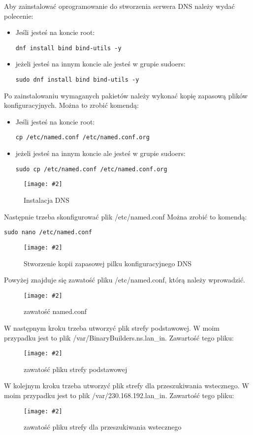 \documentclass[a4paper]{article}
\newcommand*{\zdj}[2][\textwidth]{\texttt{[image: \#2]}}
\newcommand*{\fg}[4][!htb]{
      \begin{figure*}[#1]
            \zdj{#2}
            \caption[#4]{#3}
      \end{figure*}
}
\begin{document}
\newpage
Aby zainstalować oprogramowanie do stworzenia serwera DNS należy wydać polecenie:

\begin{itemize}
      \item Jeśli jesteś na koncie root:
\begin{Verbatim}[frame=single]
dnf install bind bind-utils -y
\end{Verbatim}

      \item jeżeli jesteś na innym koncie ale jesteś w grupie sudoers:  
\begin{Verbatim}[frame=single]
sudo dnf install bind bind-utils -y
\end{Verbatim}
\end{itemize}
Po zainstalowaniu wymaganych pakietów należy wykonać kopię zapasową plików konfiguracyjnych. Można to zrobić komendą: 

\begin{itemize}
      \item Jeśli jesteś na koncie root:
\begin{Verbatim}[frame=single]
cp /etc/named.conf /etc/named.conf.org
\end{Verbatim}

      \item jeżeli jesteś na innym koncie ale jesteś w grupie sudoers:  
\begin{Verbatim}[frame=single]
sudo cp /etc/named.conf /etc/named.conf.org
\end{Verbatim}
\end{itemize}

\fg{contents/configuration/DNS/2.png}{Instalacja DNS}{Instalacja DNS}

Następnie trzeba skonfigurować plik /etc/named.conf
Można zrobić to komendą:
\begin{Verbatim}
sudo nano /etc/named.conf
\end{Verbatim} 
\fg{contents/configuration/DNS/2.png}{Stworzenie kopii zapasowej pilku konfiguracyjnego DNS}{Kopia zapasowa pilku konfiguracyjnego DNS}
\newpage
{}
Powyżej znajduje się zawatość pliku /etc/named.conf, którą należy wprowadzić.
\fg{contents/configuration/DNS/3.png}{zawatość named.conf}{zawatość named.conf}

W następnym kroku trzeba utworzyć plik strefy podstawowej. W moim przypadku jest to plik /var/BinaryBuilders.ns.lan\_in. Zawartość tego pliku:
\newpage
{}
\fg{contents/configuration/DNS/4.png}{zawatość pliku strefy podstawowej}{zawatość pliku strefy podstawowej}
W kolejnym kroku trzeba utworzyć plik strefy dla przeszukiwania wstecznego. W moim przypadku jest to plik /var/230.168.192.lan\_in. Zawartość tego pliku:
\vspace{-10pt}
\fg{contents/configuration/DNS/5.png}{zawatość pliku strefy dla przeszukiwania wstecznego}{zawatość pliku strefy dla przeszukiwania wstecznego}
\end{document}
